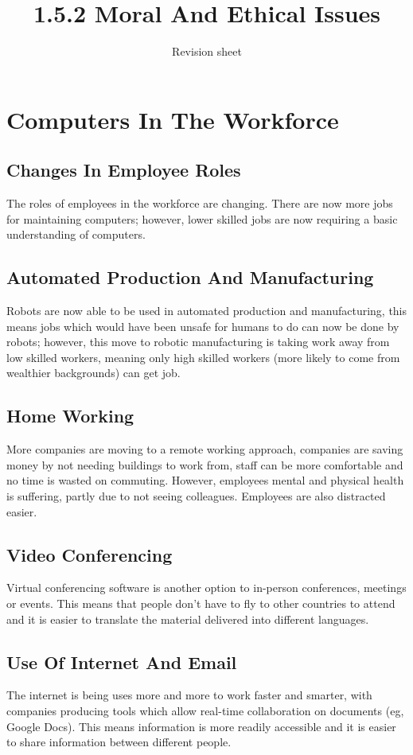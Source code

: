 \documentclass[a4paper,11pt, twocolumn]{article}
\title{1.5.2 Moral And Ethical Issues}
\author{Revision sheet}
\date{}
\begin{document}
\maketitle
\thispagestyle{fancy}

\section{Computers In The Workforce}
\subsection{Changes In Employee Roles}
The roles of employees in the workforce are changing. There are now more jobs for maintaining computers; however, lower skilled jobs are now requiring a basic understanding of computers.
\subsection{Automated Production And Manufacturing}
Robots are now able to be used in automated production and manufacturing, this means jobs which would have been unsafe for humans to do can now be done by robots; however, this move to robotic manufacturing is taking work away from low skilled workers, meaning only high skilled workers (more likely to come from wealthier backgrounds) can get job.
\subsection{Home Working}
More companies are moving to a remote working approach, companies are saving money by not needing buildings to work from, staff can be more comfortable and no time is wasted on commuting. However, employees mental and physical health is suffering, partly due to not seeing colleagues. Employees are also distracted easier.
\subsection{Video Conferencing}
Virtual conferencing software is another option to in-person conferences, meetings or events. This means that people don't have to fly to other countries to attend and it is easier to translate the material delivered into different languages.
\subsection{Use Of Internet And Email}
The internet is being uses more and more to work faster and smarter, with companies producing tools which allow real-time collaboration on documents (eg, Google Docs). This means information is more readily accessible and it is easier to share information between different people.
\end{document}
